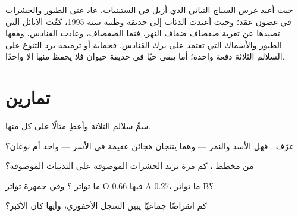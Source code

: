 \begin{example}[رد خسارة]\label{ex:g10:biodiversity-scales:reversing}
حيث أعيد غرس السياج النباتي الذي أزيل في الستينيات، عاد غنى الطيور
والحشرات في غضون عقد؛ وحيث أعيدت الذئاب إلى حديقة وطنية سنة 1995،
كفّت الأيائل التي تصيدها عن تعرية صفصاف ضفاف النهر، فنما الصفصاف،
وعادت القنادس، ومعها الطيور والأسماك التي تعتمد على برك القنادس.
فحماية  أو ترميمه يرد التنوع على السلالم الثلاثة دفعة واحدة؛
أما  يبقى حيًا في حديقة حيوان فلا يحفظ منها إلا واحدًا.
\end{example}

\section{تمارين}

\begin{exercise}[$\star$]\label{exo:g10:biodiversity-scales:1}
سمِّ سلالم  الثلاثة وأعطِ مثالًا على كل منها.
\end{exercise}

\begin{exercise}[$\star$]\label{exo:g10:biodiversity-scales:2}
عرّف . فهل الأسد والنمر --- وهما ينتجان هجائن عقيمة في الأسر ---
 واحد أم نوعان؟
\end{exercise}

\begin{exercise}[$\star$]\label{exo:g10:biodiversity-scales:3}
من مخطط ، كم مرة تزيد  الحشرات الموصوفة على 
الثدييات الموصوفة؟
\end{exercise}

\begin{exercise}[$\star$]\label{exo:g10:biodiversity-scales:4}
ما تواتر ؟ وفي جمهرة تواتر  O فيها 0.66  A 0.27،
ما تواتر B؟
\end{exercise}

\begin{exercise}[$\star$]\label{exo:g10:biodiversity-scales:5}
كم انقراضًا جماعيًا يبين السجل الأحفوري، وأيها كان الأكبر؟
\end{exercise}

